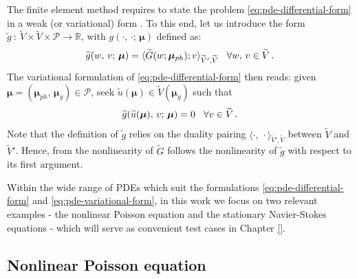 \documentclass[12pt, a4paper, twoside, openright]{report}
\numberwithin{equation}{chapter}
\theoremstyle{theorem}
\theoremstyle{definition}
\theoremstyle{remark}
\theoremstyle{proposition}
\numberwithin{figure}{chapter}
\newcommand{\wt}[1]{\widetilde{#1}}
\newcommand{\bg}[1]{\boldsymbol{#1}}
\begin{document}
		The finite element method requires to state the problem \eqref{eq:pde-differential-form} in a weak (or variational) form \cite{Qua10}. To this end, let us introduce the form $\wt{g} ~ : ~ \wt{V} \times \wt{V} \times \mathcal{P} \rightarrow \mathbb{R}$, with $g(\cdot, \, \cdot; \, \bg{\mu})$ defined as:
		\begin{equation*}
			\wt{g}(w, \, v; \, \bg{\mu}) = \langle \wt{G}(w; \bg{\mu}_{ph}); v \rangle_{\wt{V}',\wt{V}} \hspace*{0.3cm} \forall w, \, v \in \wt{V} \, .
		\end{equation*}
		The variational formulation of \eqref{eq:pde-differential-form} then reads: given $\bg{\mu} = (\bg{\mu}_{ph}, \, \bg{\mu}_g) \in \mathcal{P}$, seek $\wt{u}(\bg{\mu}) \in \wt{V}(\bg{\mu}_g)$ such that
		\begin{equation}
			\label{eq:pde-variational-form}
			\wt{g}(\wt{u}(\bg{\mu}), \, v; \, \bg{\mu}) = 0 \hspace*{0.3cm} \forall v \in \wt{V} \, .
		\end{equation}
		Note that the definition of $\wt{g}$ relies on the duality pairing $\langle \cdot, \, \cdot \rangle_{\wt{V}',\wt{V}}$ between $\wt{V}$ and $\wt{V}'$. Hence, from the nonlinearity of $\wt{G}$ follows the nonlinearity of $\wt{g}$ with respect to its first argument.
		
		Within the wide range of PDEs which suit the formulations \eqref{eq:pde-differential-form} and \eqref{eq:pde-variational-form}, in this work we focus on two relevant examples - the nonlinear Poisson equation and the stationary Navier-Stokes equations - which will serve as convenient test cases in Chapter \ref{}.
		
	\vspace*{0.3cm}
		
	\subsection{Nonlinear Poisson equation}
	\label{section:Nonlinear Poisson equation}
		
\end{document}
